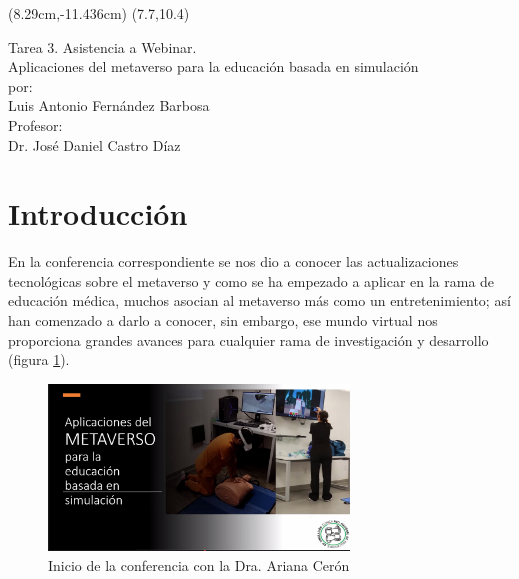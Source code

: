\documentclass[12pt]{article}
\begin{document}
	
	
	\decimalpoint
	
	\renewcommand{\tablename}{Tabla}
	
	\fancyput(8.29cm,-11.436cm){
		\setlength{\unitlength}{1in}\hspace{-0.2cm}\fancyoval(7.7,10.4)}
	\thispagestyle{empty}
	\vspace*{\fill}
	\begin{center}
		{\huge Tarea 3. Asistencia a Webinar.} \\\vspace{0.7cm}
		{\huge Aplicaciones del metaverso para la educación basada en simulación
	}\\\vspace{2cm} 
		{\Large por:}	\\\vspace{1cm} 
		{\Large Luis Antonio Fernández Barbosa\\}
		\vspace{6cm} 
	Profesor:\\
	Dr. José Daniel Castro Díaz
		
		
		
	\end{center}
	
	
	\vspace*{\fill}	
	
	\newpage
	\setcounter{page}{1}
	
	\newpage
	
	\section{Introducción}
En la conferencia correspondiente se nos dio a conocer las actualizaciones tecnológicas sobre el metaverso y como se ha empezado a aplicar en la rama de educación médica, muchos asocian al metaverso más como un entretenimiento; así han comenzado a darlo a conocer, sin embargo, ese mundo virtual nos proporciona grandes avances para cualquier rama de investigación y desarrollo (figura \ref{img_2}). 

 	\begin{figure}[h]
 	\centering
 	\includegraphics[width=8cm]{img_2}
 	\caption{Inicio de la conferencia con la Dra. Ariana Cerón}
 	\label{img_2}	
 \end{figure}
\end{document}
